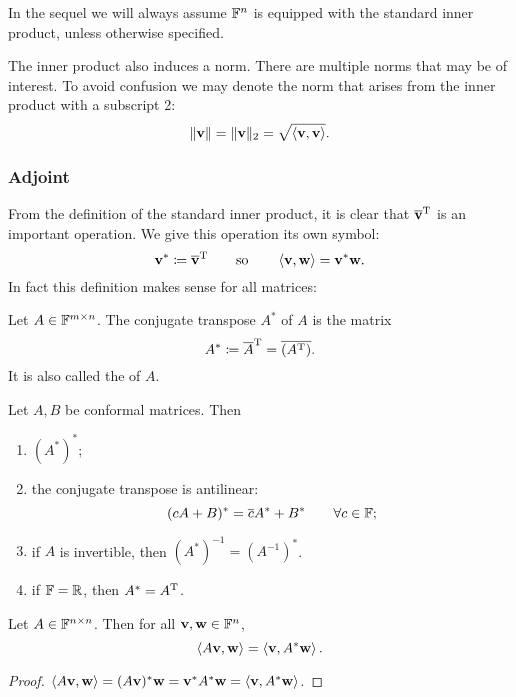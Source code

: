 In the sequel we will always assume $\mathbb{F}^n$ is equipped with the standard inner product, unless otherwise specified.

The inner product also induces a norm. There are multiple norms that may be of interest. To avoid confusion we may denote the norm that arises from the inner product with a subscript 2:
\[ \lVert\bm{\mathrm{v}}\rVert = \lVert\bm{\mathrm{v}}\rVert_2 = \sqrt{\left\langle \bm{\mathrm{v}},\bm{\mathrm{v}} \right\rangle}. \]

\subsubsection{Adjoint}
From the definition of the standard inner product, it is clear that $\overline{\bm{\mathrm{v}}}^{\mathrm{T}}$ is an important operation. We give this operation its own symbol:
\[ \bm{\mathrm{v}}^* \coloneqq  \overline{\bm{\mathrm{v}}}^{\mathrm{T}} \qquad\text{so}\qquad \left\langle \bm{\mathrm{v}},\bm{\mathrm{w}} \right\rangle = \bm{\mathrm{v}}^*\bm{\mathrm{w}}. \]
In fact this definition makes sense for all matrices:
\begin{definition}
Let $A\in\mathbb{F}^{m\times n}$. The conjugate transpose $A^*$ of $A$ is the matrix
\[ A^* \coloneqq \overline{A}^{\mathrm{T}} = \overline{(A^{\mathrm{T}})}. \]
It is also called the  of $A$.
\end{definition}
\begin{lemma}
Let $A,B$ be conformal matrices. Then
\begin{enumerate}
\item $(A^*)^*$;
\item the conjugate transpose is antilinear:
\[ (cA+B)^* = \overline{c}A^* + B^* \qquad \forall c\in\mathbb{F}; \]
\item if $A$ is invertible, then $(A^*)^{-1} = (A^{-1})^*$.
\item if $\mathbb{F}=\mathbb{R}$, then $A^* = A^{\mathrm{T}}$.
\end{enumerate}
\end{lemma}

\begin{proposition}
Let $A\in\mathbb{F}^{n\times n}$. Then for all $\bm{\mathrm{v}},\bm{\mathrm{w}}\in\mathbb{F}^n$,
\[ \left\langle A\bm{\mathrm{v}},\bm{\mathrm{w}} \right\rangle = \left\langle \bm{\mathrm{v}},A^*\bm{\mathrm{w}} \right\rangle. \]
\end{proposition}
\begin{proof}
$\left\langle A\bm{\mathrm{v}},\bm{\mathrm{w}} \right\rangle = (A\bm{\mathrm{v}})^*\bm{\mathrm{w}} = \bm{\mathrm{v}}^*A^*\bm{\mathrm{w}} = \left\langle \bm{\mathrm{v}},A^*\bm{\mathrm{w}} \right\rangle$.
\end{proof}

